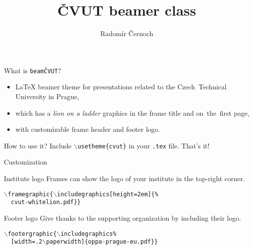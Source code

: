 \documentclass{beamer}
\title{ČVUT beamer class}
\author{Radomír Černoch}
\begin{document}
{ 
  \frame{\maketitle} }



\begin{frame}{What is \texttt{beamČVUT}?}
  \begin{itemize}
  \item \LaTeX{} beamer theme for presentations related to the
    Czech~Technical University in Prague,
  \item which has a \textit{lion on a ladder} graphics in the
    frame title and on~the~first page,
  \item with customizable frame header and footer logo.
  \end{itemize}
\end{frame}



\begin{frame}{How to use it?}
Include $\mathtt{\backslash}$\texttt{usetheme\{cvut\}} in your \texttt{.tex} file. That's it!
\end{frame}




\begin{frame}{Customization}
\begin{block}{Institute logo}
Frames can show the logo of your institute in the top-right corner.

\medskip

$\mathtt{\backslash}$\texttt{framegraphic\{$\mathtt{\backslash}$includegraphics[height=2em]\{\%\\\ \ cvut-whitelion.pdf\}\}}
\end{block}

\begin{block}{Footer logo}
Give thanks to the supporting organization by including their logo.

\medskip

$\mathtt{\backslash}$\texttt{footergraphic\{$\mathtt{\backslash}$includegraphics\%\\\ \ [width=.2$\mathtt{\backslash}$paperwidth]\{oppa-prague-eu.pdf\}\}} 
\end{block}
\end{frame}
\end{document}
